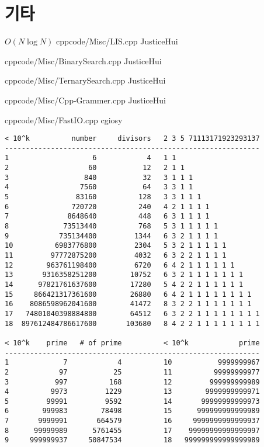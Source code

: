 \documentclass[landscape, 8pt, a4paper, twocolumn]{extarticle} %
\begin{document}
\section{기타}

{}{$O(N \log N)$}
{cpp}{code/Misc/LIS.cpp}
{JusticeHui}

{}{}
{cpp}{code/Misc/BinarySearch.cpp}
{JusticeHui}

{}{}
{cpp}{code/Misc/TernarySearch.cpp}
{JusticeHui}

{}{}
{cpp}{code/Misc/Cpp-Grammer.cpp}
{JusticeHui}

{}{}
{cpp}{code/Misc/FastIO.cpp}
{cgiosy}

\begin{verbatim}
< 10^k          number     divisors   2 3 5 71113171923293137
-------------------------------------------------------------
1                    6            4   1 1
2                   60           12   2 1 1
3                  840           32   3 1 1 1
4                 7560           64   3 3 1 1
5                83160          128   3 3 1 1 1
6               720720          240   4 2 1 1 1 1
7              8648640          448   6 3 1 1 1 1
8             73513440          768   5 3 1 1 1 1 1
9            735134400         1344   6 3 2 1 1 1 1
10          6983776800         2304   5 3 2 1 1 1 1 1
11         97772875200         4032   6 3 2 2 1 1 1 1
12        963761198400         6720   6 4 2 1 1 1 1 1 1
13       9316358251200        10752   6 3 2 1 1 1 1 1 1 1
14      97821761637600        17280   5 4 2 2 1 1 1 1 1 1
15     866421317361600        26880   6 4 2 1 1 1 1 1 1 1 1
16    8086598962041600        41472   8 3 2 2 1 1 1 1 1 1 1
17   74801040398884800        64512   6 3 2 2 1 1 1 1 1 1 1 1
18  897612484786617600       103680   8 4 2 2 1 1 1 1 1 1 1 1

< 10^k    prime   # of prime          < 10^k            prime
-------------------------------------------------------------
1             7            4          10           9999999967
2            97           25          11          99999999977
3           997          168          12         999999999989
4          9973         1229          13        9999999999971
5         99991         9592          14       99999999999973
6        999983        78498          15      999999999999989
7       9999991       664579          16     9999999999999937
8      99999989      5761455          17    99999999999999997
9     999999937     50847534          18   999999999999999989
\end{verbatim}
\end{document}

